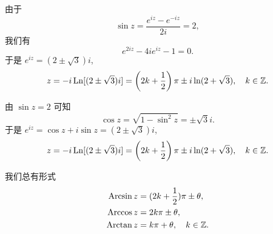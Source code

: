 \begin{solution}
  由于
  \[\sin z=\dfrac{e^{iz}-e^{-iz}}{2i}=2,\]
  我们有
  \[e^{2iz}-4ie^{iz}-1=0.\]
  于是 $e^{iz}=(2\pm\sqrt 3)i$,
  \[z=-i\operatorname{Ln}[(2\pm\sqrt 3)i]=\left(2k+\frac{1}{2}\right)\pi\pm i\ln(2+\sqrt3),\quad k\in{\mathbb{Z}}.\]
\end{solution}

\begin{solution}[另解]
	由 $\sin z=2$ 可知
	\[\cos z=\sqrt{1-\sin^2 z}=\pm\sqrt 3i.\]
	于是 $e^{iz}=\cos z+i\sin z=(2\pm\sqrt 3)i$,
		\[z=-i\operatorname{Ln}[(2\pm\sqrt 3)i]=\left(2k+\frac{1}{2}\right)\pi\pm i\ln(2+\sqrt3),\quad k\in{\mathbb{Z}}.\]
\end{solution}
我们总有形式
\begin{align*}
	\operatorname{Arcsin} z&=(2k+\frac{1}{2})\pi\pm \theta,\\
	\operatorname{Arccos} z&=2k\pi\pm \theta,\\
	\operatorname{Arctan} z&=k\pi+\theta,\quad k\in{\mathbb{Z}}.
\end{align*}



